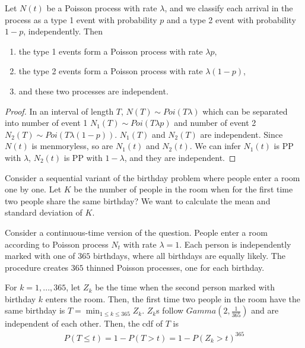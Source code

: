 \documentclass[11pt]{elegantbook}
\begin{document}
\begin{theorem}
    Let $N(t)$ be a Poisson process with rate $\lambda$, and we classify each arrival in the process as a type 1 event with probability $p$ and a type 2 event with probability $1 - p$, independently. Then
    \begin{enumerate}[(1)]
        \item the type 1 events form a Poisson process with rate $\lambda p$,
        \item the type 2 events form a Poisson process with rate $\lambda (1-p)$,
        \item and these two processes are independent.
    \end{enumerate}
\end{theorem}
\begin{proof}
    In an interval of length $T$, $N(T)\sim Poi(T\lambda)$ which can be separated into number of event 1 $N_1(T)\sim Poi(T\lambda p)$ and number of event 2 $N_2(T)\sim Poi(T\lambda(1-p))$. $N_1(T)$ and $N_2(T)$ are independent. Since $N(t)$ is menmoryless, so are $N_1(t)$ and $N_2(t)$. We can infer $N_1(t)$ is PP with $\lambda$, $N_2(t)$ is PP with $1-\lambda$, and they are independent.
\end{proof}

\begin{example}
    Consider a sequential variant of the birthday problem where people enter a room one by one. Let $K$ be the number of people in the room when for the first time two people share the same birthday? We want to calculate the mean and standard deviation of $K$.
\end{example}
\begin{solution}
    Consider a continuous-time version of the question. People enter a room according to Poisson process $N_t$ with rate $\lambda=1$. Each person is independently marked with one of $365$ birthdays, where all birthdays are equally likely. The procedure creates $365$ thinned Poisson processes, one for each birthday.

    For $k=1,...,365$, let $Z_k$ be the time when the second person marked with birthday $k$ enters the room. Then, the first time two people in the room have the same birthday is $T=\min_{1\leq k\leq 365}Z_k$. $Z_k$s follow $Gamma(2,\frac{1}{365})$ and are independent of each other. Then, the cdf of $T$ is
    \begin{equation}
        \begin{aligned}
            P(T\leq t)=1-P(T>t)=1-P(Z_k>t)^{365}
        \end{aligned}
        \nonumber
    \end{equation}
\end{solution}
\end{document}
